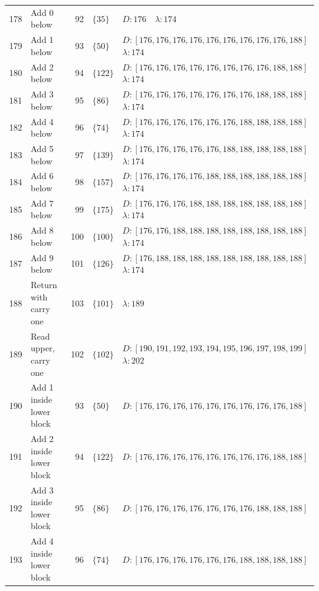 \documentclass[11pt,a4paper]{article}
\newcommand{\blank}{\lambda}
\begin{document}
\begin{longtable}{r p{4.0cm} r l p{8.1cm}}
178 & Add 0 below & 92 & $\{35\}$ & $D:176\quad \blank:174$ \\
179 & Add 1 below & 93 & $\{50\}$ & $D:[176,176,176,176,176,176,176,176,176,188]$\newline$\blank:174$ \\
180 & Add 2 below & 94 & $\{122\}$ & $D:[176,176,176,176,176,176,176,176,188,188]$\newline$\blank:174$ \\
181 & Add 3 below & 95 & $\{86\}$ & $D:[176,176,176,176,176,176,176,188,188,188]$\newline$\blank:174$ \\
182 & Add 4 below & 96 & $\{74\}$ & $D:[176,176,176,176,176,176,188,188,188,188]$\newline$\blank:174$ \\
183 & Add 5 below & 97 & $\{139\}$ & $D:[176,176,176,176,176,188,188,188,188,188]$\newline$\blank:174$ \\
184 & Add 6 below & 98 & $\{157\}$ & $D:[176,176,176,176,188,188,188,188,188,188]$\newline$\blank:174$ \\
185 & Add 7 below & 99 & $\{175\}$ & $D:[176,176,176,188,188,188,188,188,188,188]$\newline$\blank:174$ \\
186 & Add 8 below & 100 & $\{100\}$ & $D:[176,176,188,188,188,188,188,188,188,188]$\newline$\blank:174$ \\
187 & Add 9 below & 101 & $\{126\}$ & $D:[176,188,188,188,188,188,188,188,188,188]$\newline$\blank:174$ \\
188 & Return with carry one & 103 & $\{101\}$ & $\blank:189$ \\
189 & Read upper, carry one & 102 & $\{102\}$ & $D:[190,191,192,193,194,195,196,197,198,199]$\newline$\blank:202$ \\
190 & Add 1 inside lower block & 93 & $\{50\}$ & $D:[176,176,176,176,176,176,176,176,176,188]$ \\
191 & Add 2 inside lower block & 94 & $\{122\}$ & $D:[176,176,176,176,176,176,176,176,188,188]$ \\
192 & Add 3 inside lower block & 95 & $\{86\}$ & $D:[176,176,176,176,176,176,176,188,188,188]$ \\
193 & Add 4 inside lower block & 96 & $\{74\}$ & $D:[176,176,176,176,176,176,188,188,188,188]$ \\

\end{longtable}
\end{document}
